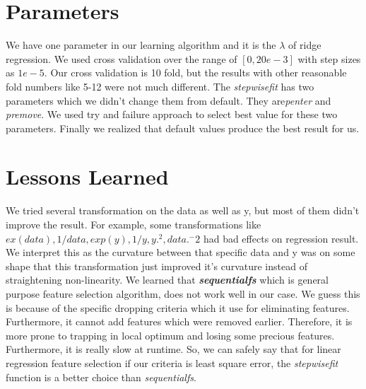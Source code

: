 \documentclass[a4paper, 11pt]{article}
\begin{document}
\section{Parameters}
We have one  parameter in our learning algorithm and it is the $\lambda$ of ridge regression. We used cross validation over the range of $[0, 20e-3]$ with step sizes as $1e-5$. Our cross validation is 10 fold, but the results with other reasonable fold numbers like 5-12 were not much different. The \textit{stepwisefit} has two parameters which we didn't change them from default. They are\textit{penter} and \textit{premove}. We used try and failure approach to select best value for these two parameters. Finally we realized that default values produce the best result for us.

\section{Lessons Learned} 
We tried several transformation on the data as well as y, but most of them didn't improve the result. For example, some transformations like $ex(data), 1/data, exp(y), 1/y, y.^2, data.^-2$ had bad effects on regression result. We interpret this as the curvature between that specific data and y was on some shape that this transformation just improved it's curvature instead of straightening non-linearity. We learned that \textbf{\textit{sequentialfs}} which is general purpose feature selection algorithm, does not work well in our case. We guess this is because of the specific dropping criteria which it use for eliminating features. Furthermore, it cannot add features which were removed earlier. Therefore, it is more prone to trapping in local optimum and losing some precious features. Furthermore, it is really slow at runtime. So, we can safely say that for linear regression feature selection if our criteria is least square error, the \textit{stepwisefit} function is a better choice than \textit{sequentialfs}.  
\end{document}
